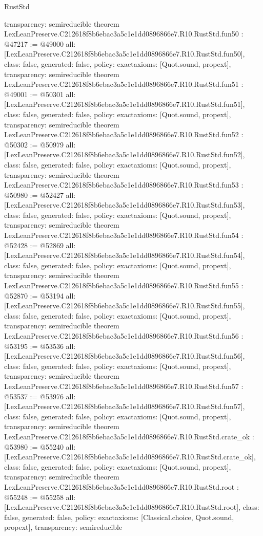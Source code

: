 \begin{lexlean}{RustStd}
\begin{coremodule}
{  transparency: semireducible
}
theorem LexLeanPreserve.C212618f8b6ebac3a5c1e1dd0896866e7.R10.RustStd.fun50 : @47217 := @49000 {
  all: [LexLeanPreserve.C212618f8b6ebac3a5c1e1dd0896866e7.R10.RustStd.fun50],
  class: false,
  generated: false,
  policy: exact{axioms: [Quot.sound, propext]},
  transparency: semireducible
}
theorem LexLeanPreserve.C212618f8b6ebac3a5c1e1dd0896866e7.R10.RustStd.fun51 : @49001 := @50301 {
  all: [LexLeanPreserve.C212618f8b6ebac3a5c1e1dd0896866e7.R10.RustStd.fun51],
  class: false,
  generated: false,
  policy: exact{axioms: [Quot.sound, propext]},
  transparency: semireducible
}
theorem LexLeanPreserve.C212618f8b6ebac3a5c1e1dd0896866e7.R10.RustStd.fun52 : @50302 := @50979 {
  all: [LexLeanPreserve.C212618f8b6ebac3a5c1e1dd0896866e7.R10.RustStd.fun52],
  class: false,
  generated: false,
  policy: exact{axioms: [Quot.sound, propext]},
  transparency: semireducible
}
theorem LexLeanPreserve.C212618f8b6ebac3a5c1e1dd0896866e7.R10.RustStd.fun53 : @50980 := @52427 {
  all: [LexLeanPreserve.C212618f8b6ebac3a5c1e1dd0896866e7.R10.RustStd.fun53],
  class: false,
  generated: false,
  policy: exact{axioms: [Quot.sound, propext]},
  transparency: semireducible
}
theorem LexLeanPreserve.C212618f8b6ebac3a5c1e1dd0896866e7.R10.RustStd.fun54 : @52428 := @52869 {
  all: [LexLeanPreserve.C212618f8b6ebac3a5c1e1dd0896866e7.R10.RustStd.fun54],
  class: false,
  generated: false,
  policy: exact{axioms: [Quot.sound, propext]},
  transparency: semireducible
}
theorem LexLeanPreserve.C212618f8b6ebac3a5c1e1dd0896866e7.R10.RustStd.fun55 : @52870 := @53194 {
  all: [LexLeanPreserve.C212618f8b6ebac3a5c1e1dd0896866e7.R10.RustStd.fun55],
  class: false,
  generated: false,
  policy: exact{axioms: [Quot.sound, propext]},
  transparency: semireducible
}
theorem LexLeanPreserve.C212618f8b6ebac3a5c1e1dd0896866e7.R10.RustStd.fun56 : @53195 := @53536 {
  all: [LexLeanPreserve.C212618f8b6ebac3a5c1e1dd0896866e7.R10.RustStd.fun56],
  class: false,
  generated: false,
  policy: exact{axioms: [Quot.sound, propext]},
  transparency: semireducible
}
theorem LexLeanPreserve.C212618f8b6ebac3a5c1e1dd0896866e7.R10.RustStd.fun57 : @53537 := @53976 {
  all: [LexLeanPreserve.C212618f8b6ebac3a5c1e1dd0896866e7.R10.RustStd.fun57],
  class: false,
  generated: false,
  policy: exact{axioms: [Quot.sound, propext]},
  transparency: semireducible
}
theorem LexLeanPreserve.C212618f8b6ebac3a5c1e1dd0896866e7.R10.RustStd.crate_ok : @53980 := @55240 {
  all: [LexLeanPreserve.C212618f8b6ebac3a5c1e1dd0896866e7.R10.RustStd.crate_ok],
  class: false,
  generated: false,
  policy: exact{axioms: [Quot.sound, propext]},
  transparency: semireducible
}
theorem LexLeanPreserve.C212618f8b6ebac3a5c1e1dd0896866e7.R10.RustStd.root : @55248 := @55258 {
  all: [LexLeanPreserve.C212618f8b6ebac3a5c1e1dd0896866e7.R10.RustStd.root],
  class: false,
  generated: false,
  policy: exact{axioms: [Classical.choice, Quot.sound, propext]},
  transparency: semireducible
}


\end{coremodule}
\end{lexlean}
